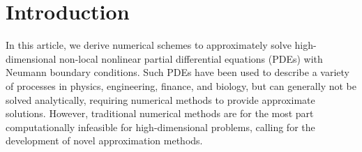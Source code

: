 \section{Introduction}
In this article, we derive numerical schemes to approximately solve high-dimensional non-local nonlinear partial differential equations (PDEs) with Neumann boundary conditions. 
%
Such PDEs have been used to describe  a variety of processes in physics, engineering, finance, and biology, but can generally not be solved analytically, requiring numerical methods to provide approximate solutions. However, traditional numerical methods are for the most part computationally infeasible for high-dimensional problems, calling for the development of novel approximation methods.

